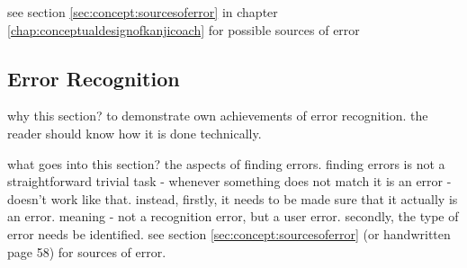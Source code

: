     

    
    



see section \ref{sec:concept:sourcesoferror} in chapter 
\ref{chap:conceptualdesignofkanjicoach} for possible sources of error

\subsection{Error Recognition}
\label{sec:hwre:errorrecognition}

why this section? to demonstrate own achievements of error recognition.
the reader should know how it is done technically.

what goes into this section? the aspects of finding errors. finding errors
is not a straightforward trivial task - whenever something does not match
it is an error - doesn't work like that. instead, 
firstly, it needs to be made sure that it actually is an error.
meaning - not a recognition error, but a user error.
secondly, the type of error needs be identified.
see section \ref{sec:concept:sourcesoferror} (or handwritten page 58)
for sources of error.


